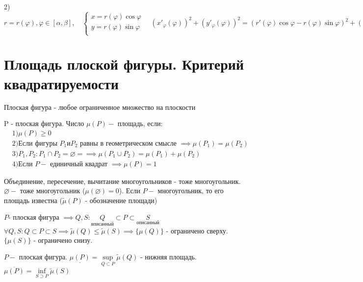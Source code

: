 \documentclass[../main.tex]{subfiles}
\begin{document}
 2)$r=r(\varphi), \varphi \in [\alpha,\beta], \quad \begin{cases}
    x=r(\varphi)\cos{\varphi}\\ 
    y=r(\varphi)\sin{\varphi}\\ 
\end{cases}\quad (x'_{\varphi}(\varphi))^{2}+(y'_{\varphi}(\varphi))^{2}=(r'(\varphi)\cos{\varphi}-r(\varphi)\sin{\varphi})^{2}+(r'(\varphi)\sin{\varphi}+r(\varphi)\cos{\varphi})^{2}=r^{2}(\varphi)+(r'(\varphi))^{2}\implies l(L) = \int\limits_{\alpha}^{\beta}\sqrt{r^{2}(\varphi)+(r'(\varphi))^{2}} $
\section{Площадь плоской фигуры. Критерий квадратируемости}
\begin{definition}
    Плоская фигура - любое ограниченное множество на плоскости
\end{definition}
\begin{definition}
    P - плоская фигура. Число $\mu(P)- $ площадь, если: \\
    $\begin{aligned} &1) \mu(P)\geqslant 0
    \\&2) \text{Если фигуры } P_{1} и P_{2} \text{ равны в геометрическом смысле }\implies \mu(P_{1})=\mu(P_{2})
    \\&3)P_{1},P_{2}: P_{1} \cap P_{2} =\varnothing = \implies\mu(P_{1} \cup P_{2})=\mu(P_{1})+\mu(P_{2})
    \\&4) \text{Если } P- \text{ единичный квадрат } \implies \mu(P)=1\end{aligned}$
\end{definition}
\vspace{1cm}
\noindent Объединение, пересечение, вычитание многоугольников - тоже многоугольник. \\$\varnothing  -$ тоже многоугольник ($\mu(\varnothing )=0$). Если $P-$ многоугольник, то его площадь известна ($\tilde{\mu}(P)$ - обозначение площади)

$P$- плоская фигура $\implies Q, S : \underset{вписанный}{Q}\subset P \subset \underset{описанный}{S}$
\\$\forall Q,S : Q\subset P \subset S \implies \tilde{\mu}(Q) \leqslant \tilde{\mu}(S)\implies \{\mu(Q)\}$ - ограничено сверху. $\{\mu(S)\}$ - ограничено снизу.

\begin{definition}
    $ P-$ плоская фигура. $\underline{\mu(P)}=\underset{Q \subset P }{\sup}{\tilde{\mu}(Q)}$ - нижняя площадь. $\overline{\mu(P)}=\underset{S\supset P}{\inf}{\tilde{\mu}(S)}$
\end{definition}
\end{document}
